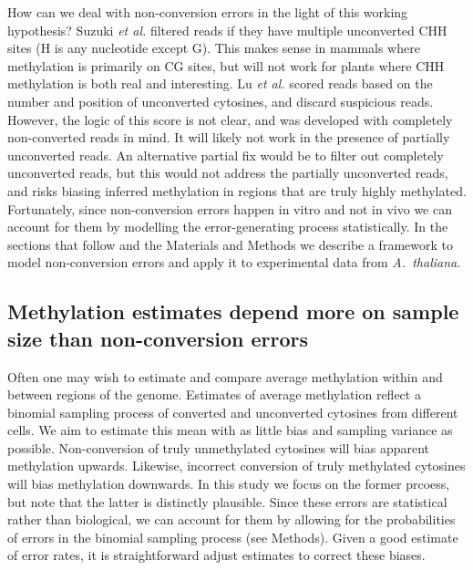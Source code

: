 \documentclass[10pt,draft,letterpaper]{article}
\begin{document}
How can we deal with non-conversion errors in the light of this working hypothesis?
Suzuki \textit{et al.}\cite{suzuki2018whole} filtered reads if they have multiple unconverted CHH sites (H is any nucleotide except G).
This makes sense in mammals where methylation is primarily on CG sites, but will not work for plants where CHH methylation is both real and interesting.
Lu \textit{et al.} \cite{lu2015improved} scored reads based on the number and position of unconverted cytosines, and discard suspicious reads.
However, the logic of this score is not clear, and was developed with completely non-converted reads in mind.
It will likely not work in the presence of partially unconverted reads.
An alternative partial fix would be to filter out completely unconverted reads, but this would not address the partially unconverted reads, and risks biasing inferred methylation in regions that are truly highly methylated.
Fortunately, since non-conversion errors happen in vitro and not in vivo we can account for them by modelling the error-generating process statistically.
In the sections that follow and the Materials and Methods we describe a framework to model non-conversion errors and apply it to experimental data from \emph{A.~thaliana}.

\subsection*{Methylation estimates depend more on sample size than non-conversion errors}

Often one may wish to estimate and compare average methylation within and between regions of the genome.
Estimates of average methylation reflect a binomial sampling process of converted and unconverted cytosines from different cells.
We aim to estimate this mean with as little bias and sampling variance as possible.
Non-conversion of truly unmethylated cytosines will bias apparent methylation upwards.
Likewise, incorrect conversion of truly methylated cytosines will bias methylation downwards.
In this study we focus on the former prcoess, but note that the latter is distinctly plausible.
Since these errors are statistical rather than biological, we can account for them by allowing for the probabilities of errors in the binomial sampling process (see Methods).
Given a good estimate of error rates, it is straightforward adjust estimates to correct these biases.
\end{document}
